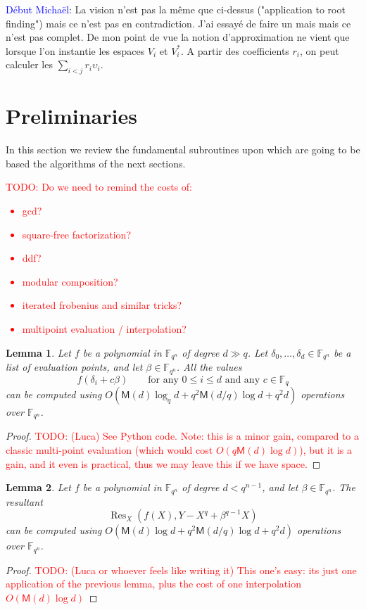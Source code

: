 \documentclass{sig-alternate}
\newcommand{\ff}[1]{\mathbb{F}_{#1}}
\newcommand{\dd}{d}
\newcommand{\qq}{q}
\newcommand{\nn}{n}
\newcommand{\qn}{{\qq^\nn}}
\newcommand{\basef}{\ff{\qq}}
\newcommand{\extf}{\ff{\qn}}
\newcommand{\Mul}{\mathsf{M}}
\DeclareMathOperator{\Res}{Res}
\newcounter{algo}
\newcommand{\todo}[1]{\textcolor{red}{TODO: #1}}
\newcommand{\comd}{\noindent \textcolor{blue}{D\'ebut Micha\"el}:}
\newtheorem{Lem}{Lemma}
\begin{document}
\comd
{\bf }La vision n'est pas la m\^eme que ci-dessus ("application to root finding") mais ce n'est pas en contradiction. J'ai essay\'e de faire un mais mais ce n'est pas complet. De mon point de vue la notion d'approximation ne vient que lorsque l'on instantie les espaces $V_i$ et $V_i^\ast$. A partir des coefficients $r_i$, on peut calculer les $\sum_{i<j} r_i \upsilon_i$.

\section{Preliminaries}

In this section we review the fundamental subroutines upon which are
going to be based the algorithms of the next sections.

\todo{Do we need to remind the costs of:
  \begin{itemize}
  \item gcd?
  \item square-free factorization?
  \item ddf?
  \item modular composition?
  \item iterated frobenius and similar tricks?
  \item multipoint evaluation / interpolation?
  \end{itemize}
}

\begin{Lem}
  Let $f$ be a polynomial in $\extf$ of degree $\dd\gg\qq$. Let
  $\delta_0,\dots,\delta_\dd\in\extf$ be a list of evaluation points,
  and let $\beta\in\extf$.  All the values
  \begin{equation*}
    f(\delta_i + c\beta) \qquad\text{for any $0\le i\le d$ and any $c\in\basef$}
  \end{equation*}
  can be computed using $O(\Mul(\dd) \log_\qq\dd +
  \qq^2\Mul(\dd/\qq)\log\dd + \qq^2\dd)$ operations over $\extf$.
\end{Lem}
\begin{proof}
  \todo{(Luca) See Python code. Note: this is a minor gain, compared
    to a classic multi-point evaluation (which would cost
    $O(\qq\Mul(d)\log d)$), but it is a gain, and it even is
    practical, thus we may leave this if we have space.}
\end{proof}

\begin{Lem}
  Let $f$ be a polynomial in $\extf$ of degree $d<\qq^{\nn-1}$, and
  let $\beta\in\extf$. The resultant
  \begin{equation*}
    \Res_X(f(X), Y-X^\qq+\beta^{\qq-1} X)
  \end{equation*}
  can be computed using $O(\Mul(\dd) \log\dd +
  \qq^2\Mul(\dd/\qq)\log\dd + \qq^2\dd)$ operations over $\extf$.
\end{Lem}
\begin{proof}
  \todo{(Luca or whoever feels like writing it) This one's easy: its
    just one application of the previous lemma, plus the cost of one
    interpolation $O(\Mul(d)\log d)$}
\end{proof}
\end{document}
